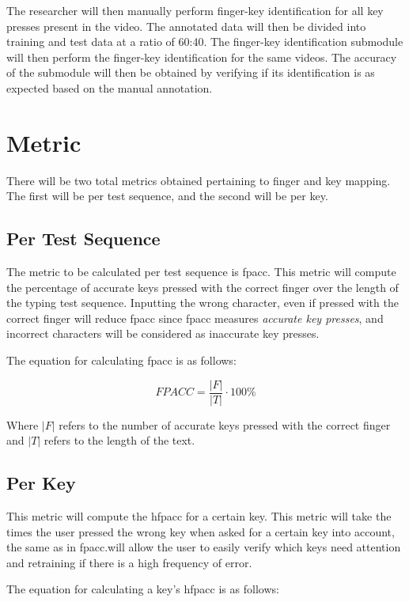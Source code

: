 \documentclass{report}
\begin{document}
The researcher will then manually perform finger-key identification for all key
presses present in the video. The annotated data will then be divided into
training and test data at a ratio of 60:40. The finger-key identification
submodule will then perform the finger-key identification for the same videos.
The accuracy of the submodule will then be obtained by verifying if its
identification is as expected based on the manual annotation.

\section{Metric}
\label{section:metric}

There will be two total metrics obtained pertaining to finger and key mapping.
The first will be per test sequence, and the second will be per key.

\subsection{Per Test Sequence}
The metric to be calculated per test sequence is \ac{fpacc}. This metric will
compute the percentage of accurate keys pressed with the correct finger over the
length of the typing test sequence. Inputting the wrong character, even if
pressed with the correct finger will reduce \ac{fpacc} since \ac{fpacc} measures
\emph{accurate key presses}, and incorrect characters will be considered as
inaccurate key presses.

The equation for calculating \ac{fpacc} is as follows:

\begin{equation}
	FP ACC = \frac{|F|}{|T|} \cdot 100\%
\end{equation}

Where $|F|$ refers to the number of accurate keys pressed with the
correct finger and $|T|$ refers to the length of the text.

\subsection{Per Key}
This metric will compute the \ac{hfpacc} for a certain key. This metric will
take the times the user pressed the wrong key when asked for a certain key into
account, the same as in \ac{fpacc}.\@This will allow the user to easily verify
which keys need attention and retraining if there is a high frequency of error.

The equation for calculating a key's \ac{hfpacc} is as follows:
\end{document}
